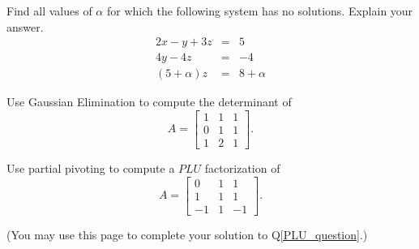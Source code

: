 \documentclass[addpoints,11pt]{exam}
\begin{document}
\begin{questions}
\question[5] 
Find all values of $\alpha$ for which the following system has no solutions. Explain your answer. 
\begin{eqnarray*} 
2x  -y + 3z & = & 5 \\
4y - 4z & = & -4 \\
(5 + \alpha)z & = & 8 + \alpha 
\end{eqnarray*} 

\vfill 

\newpage 

\question[10] 
Use Gaussian Elimination to compute the determinant of 
\[ 
A = \left[
\begin{array}{ccc} 
1 & 1 & 1 \\
0 & 1 & 1 \\
1 & 2 & 1
\end{array}
\right] .
\]

\newpage 

\question[20]
\label{PLU_question} 

Use partial pivoting to compute a $PLU$ factorization of 
\[ 
A = 
\left[
\begin{array}{ccc} 
0 & 1 & 1 \\
1 & 1 & 1 \\
-1 & 1 & -1
\end{array}
\right] .
\]

\newpage 
(You may use this page to complete your solution to Q\ref{PLU_question}.) 


\end{questions} 
\end{document}
